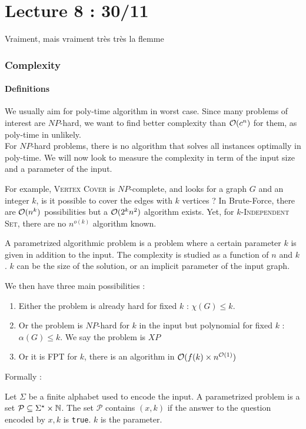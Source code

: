 \documentclass{cours}
\begin{document}
\part[Shortest Paths / Graph Coloring]{Lecture 8 : 30/11}
Vraiment, mais vraiment très très la flemme

\section{Complexity}
\subsection{Definitions}
We usually aim for poly-time algorithm in worst case. Since many problems of interest are $NP$-hard, we want to find better complexity than $\mathcal{O}(c^{n})$ for them, as poly-time in unlikely. \\
For $NP$-hard problems, there is no algorithm that solves all instances optimally in poly-time. We will now look to measure the complexity in term of the input size and a parameter of the input.

For example, \textsc{Vertex Cover} is $NP$-complete, and looks for a graph $G$ and an integer $k$, is it possible to cover the edges with $k$ vertices ? In Brute-Force, there are $\mathcal{O}(n^{k})$ possibilities but a $\mathcal{O}(2^{k}n^{2})$ algorithm exists. Yet, for $k$-\textsc{Independent Set}, there are no $n^{o(k)}$ algorithm known.

\begin{definition}
    A parametrized algorithmic problem is a problem where a certain parameter $k$ is given in addition to the input. The complexity is studied as a function of $n$ and $k$. $k$ can be the size of the solution, or an implicit parameter of the input graph.
\end{definition}

We then have three main possibilities :
\begin{enumerate}
    \item Either the problem is already hard for fixed $k$ : $\chi(G) \leq k$.
    \item Or the problem is $NP$-hard for $k$ in the input but polynomial for fixed $k$ : $\alpha(G) \leq k$. We say the problem is $XP$
    \item Or it is FPT for $k$, there is an algorithm in $\mathcal{O}(f(k)\times n^{\mathcal{O}(1)})$
\end{enumerate}

Formally :
\begin{definition}
    Let $\Sigma$ be a finite alphabet used to encode the input. A parametrized problem is a set $\mathcal{P} \subseteq \Sigma^{\star} \times \mathbb{N}$. The set $\mathcal{P}$ contains $(x, k)$ if the answer to the question encoded by $x, k$ is \texttt{true}. $k$ is the parameter.
\end{definition}
\end{document}
